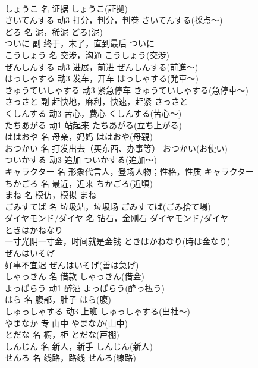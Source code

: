 \documentclass[8pt]{extreport}
\begin{document}
\begin{CJK}{UTF8}{min}
\\	しょうこ	名	证据	しょうこ(証拠)	
\\	さいてんする	动3	打分，判分，判卷	さいてんする(採点～)	
\\	どろ	名	泥，稀泥	どろ(泥)	
\\	ついに	副	终于，末了，直到最后	ついに	
\\	こうしょう	名	交涉，沟通	こうしょう(交渉)	
\\	ぜんしんする	动3	进展，前进	ぜんしんする(前進～)	
\\	はっしゃする	动3	发车，开车	はっしゃする(発車～)	
\\	きゅうていしゃする	动3	紧急停车	きゅうていしゃする(急停車～)	
\\	さっさと	副	赶快地，麻利，快速，赶紧	さっさと	
\\	くしんする	动3	苦心，费心	くしんする(苦心～)	
\\	たちあがる	动1	站起来	たちあがる(立ち上がる)	
\\	ははおや	名	母亲，妈妈	ははおや(母親)	
\\	おつかい	名	打发出去（买东西、办事等）	おつかい(お使い)	
\\	ついかする	动3	追加	ついかする(追加～)	
\\	キャラクター	名	形象代言人，登场人物；性格，性质	キャラクター	
\\	ちかごろ	名	最近，近来	ちかごろ(近頃)	
\\	まね	名	模仿，模拟	まね	
\\	ごみすてば	名	垃圾站，垃圾场	ごみすてば(ごみ捨て場)	
\\	ダイヤモンド/ダイヤ	名	钻石，金刚石	ダイヤモンド/ダイヤ	
\\	ときはかねなり	
\\	一寸光阴一寸金，时间就是金钱	ときはかねなり(時は金なり)	
\\	ぜんはいそげ	
\\	好事不宜迟	ぜんはいそげ(善は急げ)	
\\	しゃっきん	名	借款	しゃっきん(借金)	
\\	よっぱらう	动1	醉酒	よっぱらう(酔っ払う)	
\\	はら	名	腹部，肚子	はら(腹)	
\\	しゅっしゃする	动3	上班	しゅっしゃする(出社～)	
\\	やまなか	专	山中	やまなか(山中)	
\\	とだな	名	橱，柜	とだな(戸棚)	
\\	しんじん	名	新人，新手	しんじん(新人)	
\\	せんろ	名	线路，路线	せんろ(線路)	

\end{CJK}
\end{document}
